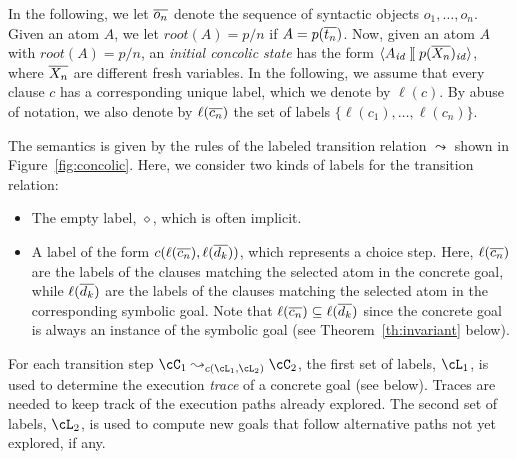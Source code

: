 \documentclass[fleqn]{tlp}
\newcommand{\rt}{\mathit{root}}
\newcommand{\id}{{\mathit{id}}}
\newcommand{\sep}{\mathit{\;]\![\;}}
\def \tuple#1{\langle #1 \rangle}
\begin{document}
In the following, we let $\overline{o_n}$ denote the sequence of syntactic
objects $o_1,\ldots,o_n$.
Given an atom $A$, we let $\rt(A)= p/n$ if $A= p(\overline{t_n})$.
Now, given an atom $A$ with $\rt(A)=p/n$, an \emph{initial concolic
  state} has the form $\tuple{A_\id\sep p(\ol{X_n})_\id}$, where
$\overline{X_n}$ are different fresh variables. In the following, we assume
that every clause $c$ has a corresponding unique label, which we
denote by $\ell(c)$. By abuse of notation, we also denote by
$\ell(\overline{c_n})$ the set of labels $\{\ell(c_1),\ldots,\ell(c_n)\}$.

The semantics is given by the rules of the labeled transition
relation $\leadsto$ shown in Figure~\ref{fig:concolic}. Here, we
consider two kinds of labels for the transition relation:
\begin{itemize}
\item The empty label, $\diamond$, which is often implicit.
\item A label of the form $c(\ell(\overline{c_n}),\ell(\overline{d_k}))$, which
  represents a choice step. Here, $\ell(\overline{c_n})$ are the labels of
  the clauses matching the selected atom in the concrete goal, while
  $\ell(\overline{d_k})$ are the labels of the clauses matching the selected
  atom in the corresponding symbolic goal. Note that $\ell(\overline{c_n})
  \subseteq \ell(\overline{d_k})$ since the concrete goal is always an
  instance of the symbolic goal (see Theorem~\ref{th:invariant}
  below).
\end{itemize}
For each transition step $\cC_1 \leadsto_{c(\cL_1,\cL_2)} \cC_2$, the
first set of labels, $\cL_1$, is used to determine the execution
\emph{trace} of a concrete goal (see below). Traces are needed to keep
track of the execution paths already explored. The second set of
labels, $\cL_2$, is used to compute new goals that follow alternative
paths not yet explored, if any.
\end{document}
